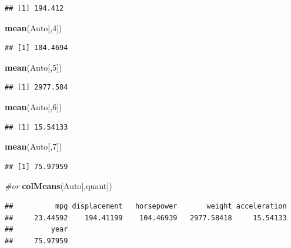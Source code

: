 \documentclass[]{article}
\newenvironment{Shaded}{\begin{snugshade}}{\end{snugshade}}
\newcommand{\KeywordTok}[1]{\textcolor[rgb]{0.13,0.29,0.53}{\textbf{#1}}}
\newcommand{\DecValTok}[1]{\textcolor[rgb]{0.00,0.00,0.81}{#1}}
\newcommand{\CommentTok}[1]{\textcolor[rgb]{0.56,0.35,0.01}{\textit{#1}}}
\newcommand{\NormalTok}[1]{#1}
\begin{document}
\begin{verbatim}
## [1] 194.412
\end{verbatim}

\begin{Shaded}
\begin{Highlighting}[]
\KeywordTok{mean}\NormalTok{(Auto[,}\DecValTok{4}\NormalTok{])}
\end{Highlighting}
\end{Shaded}

\begin{verbatim}
## [1] 104.4694
\end{verbatim}

\begin{Shaded}
\begin{Highlighting}[]
\KeywordTok{mean}\NormalTok{(Auto[,}\DecValTok{5}\NormalTok{])}
\end{Highlighting}
\end{Shaded}

\begin{verbatim}
## [1] 2977.584
\end{verbatim}

\begin{Shaded}
\begin{Highlighting}[]
\KeywordTok{mean}\NormalTok{(Auto[,}\DecValTok{6}\NormalTok{])}
\end{Highlighting}
\end{Shaded}

\begin{verbatim}
## [1] 15.54133
\end{verbatim}

\begin{Shaded}
\begin{Highlighting}[]
\KeywordTok{mean}\NormalTok{(Auto[,}\DecValTok{7}\NormalTok{])}
\end{Highlighting}
\end{Shaded}

\begin{verbatim}
## [1] 75.97959
\end{verbatim}

\begin{Shaded}
\begin{Highlighting}[]
\CommentTok{#or}
\KeywordTok{colMeans}\NormalTok{(Auto[,quant])}
\end{Highlighting}
\end{Shaded}

\begin{verbatim}
##          mpg displacement   horsepower       weight acceleration 
##     23.44592    194.41199    104.46939   2977.58418     15.54133 
##         year 
##     75.97959
\end{verbatim}
\end{document}

